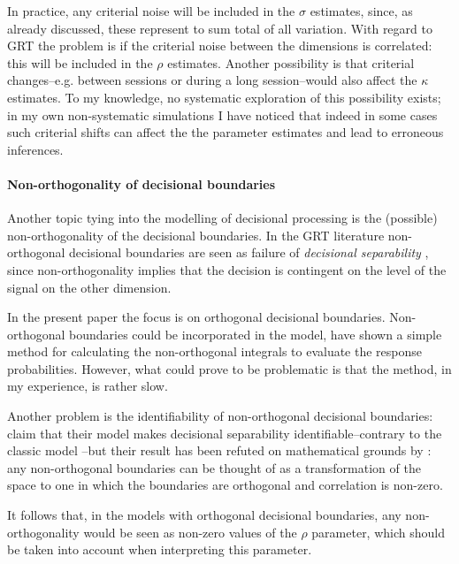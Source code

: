 \documentclass{article}\usepackage{knitr}
\begin{document}
In practice, any criterial noise will be included in the $\sigma$ estimates, since, as already discussed, these represent to sum total of all variation. With regard to GRT the problem is if the criterial noise between the dimensions is correlated: this will be included in the $\rho$ estimates. Another possibility is that criterial changes--e.g. between sessions or during a long session--would also affect the $\kappa$ estimates. To my knowledge, no systematic exploration of this possibility exists; in my own non-systematic simulations I have noticed that indeed in some cases such criterial shifts can affect the the parameter estimates and lead to erroneous inferences. 

\paragraph{Non-orthogonality of decisional boundaries}

Another topic tying into the modelling of decisional processing is the (possible) non-orthogonality of the decisional boundaries. In the GRT literature non-orthogonal decisional boundaries are seen as failure of \textit{decisional separability} \citep{ashby2015}, since non-orthogonality implies that the decision is contingent on the level of the signal on the other dimension. 

In the present paper the focus is on orthogonal decisional boundaries. Non-orthogonal boundaries could be incorporated in the model, \cite{ennis2003} have shown a simple method for calculating the non-orthogonal integrals to evaluate the response probabilities. However, what could prove to be problematic is that the method, in my experience, is rather slow.  

Another problem is the identifiability of non-orthogonal decisional boundaries: \cite{soto2015} claim that their model makes decisional separability identifiable--contrary to the classic model \citep{silbert2013}--but their result has been refuted on mathematical grounds by \cite{silbert2016}: any non-orthogonal boundaries can be thought of as a transformation of the space to one in which the boundaries are orthogonal and correlation is non-zero. 

It follows that, in the models with orthogonal decisional boundaries, any non-orthogonality would be seen as non-zero values of the $\rho$ parameter, which should be taken into account when interpreting this parameter.

\newpage
\end{document}
